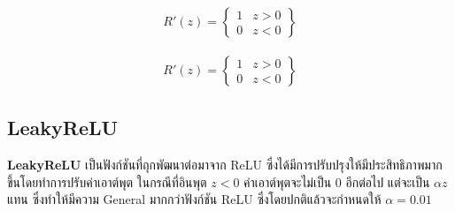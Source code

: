 \begin{figure}[H]
\begin{subfigure}{0.5\textwidth}
      \caption{%
          \begin{equation}
              \begin{split}R'(z) =
                  \begin{Bmatrix}
                      1 & z>0 \\
                      0 & z<0
                  \end{Bmatrix}
              \end{split}
          \end{equation}
      }
      \label{fig:actfunc_relu_der}
  \end{subfigure}
\end{figure}

\subsection{LeakyReLU}

\textbf{LeakyReLU}\autocite{he2015} เป็นฟังก์ชันที่ถุกพัฒนาต่อมาจาก ReLU ซึ่งได้มีการปรับปรุงให้มีประสิทธิภาพมากขึ้นโดยทำการปรับค่าเอาต์พุต ในกรณีที่อินพุต $z < 0$ ค่าเอาต์พุตจะไม่เป็น 0 อีกต่อไป แต่จะเป็น $\alpha z$ แทน ซึ่งทำให้มีความ General มากกว่าฟังก์ชัน ReLU ซึ่งโดยปกติแล้วจะกำหนดให้ $\alpha = 0.01$

